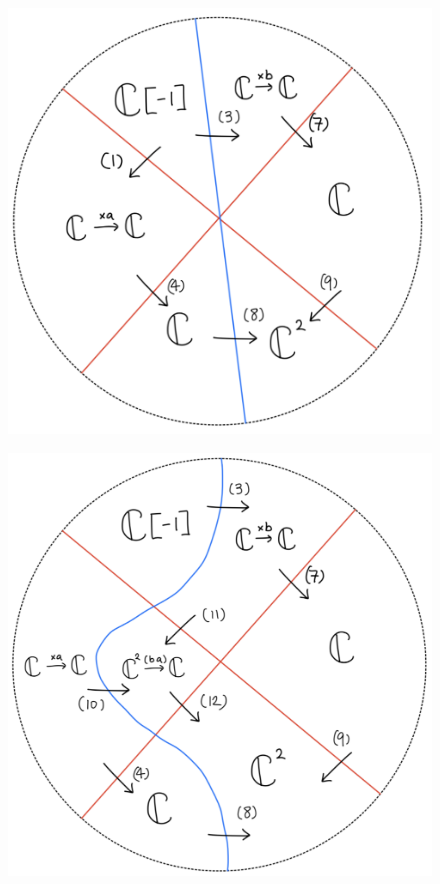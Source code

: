 \begin{figure}[H]
    \centering
    \includegraphics[scale = 0.95]{diagrams/lemma4/29.png}
    \caption{}
    \label{fig:your-label}
\end{figure}
\begin{figure}[H]
    \centering
    \includegraphics[scale = 0.95]{diagrams/lemma4/30.png}
    \caption{}
    \label{fig:your-label}
\end{figure}
